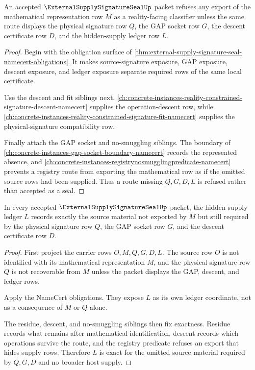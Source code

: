 \begin{theorem}
\label{thm:external-supply-signature-seal-descent-refusal}
An accepted $\ExternalSupplySignatureSealUp$ packet refuses any export of the mathematical representation row $M$ as a reality-facing classifier unless the same route displays the physical signature row $Q$, the GAP socket row $G$, the descent certificate row $D$, and the hidden-supply ledger row $L$.
\end{theorem}
\begin{proof}
Begin with the obligation surface of \autoref{thm:external-supply-signature-seal-namecert-obligations}. It makes source-signature exposure, GAP exposure, descent exposure, and ledger exposure separate required rows of the same local certificate.

Use the descent and fit siblings next. \autoref{ch:concrete-instances-reality-constrained-signature-descent-namecert} supplies the operation-descent row, while \autoref{ch:concrete-instances-reality-constrained-signature-fit-namecert} supplies the physical-signature compatibility row.

Finally attach the GAP socket and no-smuggling siblings. The boundary of \autoref{ch:concrete-instances-gap-socket-boundary-namecert} records the represented absence, and \autoref{ch:concrete-instances-registrynosmugglingpredicate-namecert} prevents a registry route from exporting the mathematical row as if the omitted source rows had been supplied. Thus a route missing $Q,G,D,L$ is refused rather than accepted as a seal.
\end{proof}

\begin{theorem}
\label{thm:external-supply-signature-seal-ledger-exactness}
In every accepted $\ExternalSupplySignatureSealUp$ packet, the hidden-supply ledger $L$ records exactly the source material not exported by $M$ but still required by the physical signature row $Q$, the GAP socket row $G$, and the descent certificate row $D$.
\end{theorem}
\begin{proof}
First project the carrier rows $O,M,Q,G,D,L$. The source row $O$ is not identified with its mathematical representation $M$, and the physical signature row $Q$ is not recoverable from $M$ unless the packet displays the GAP, descent, and ledger rows.

Apply the NameCert obligations. They expose $L$ as its own ledger coordinate, not as a consequence of $M$ or $Q$ alone.

The residue, descent, and no-smuggling siblings then fix exactness. Residue records what remains after mathematical identification, descent records which operations survive the route, and the registry predicate refuses an export that hides supply rows. Therefore $L$ is exact for the omitted source material required by $Q,G,D$ and no broader host supply.
\end{proof}

